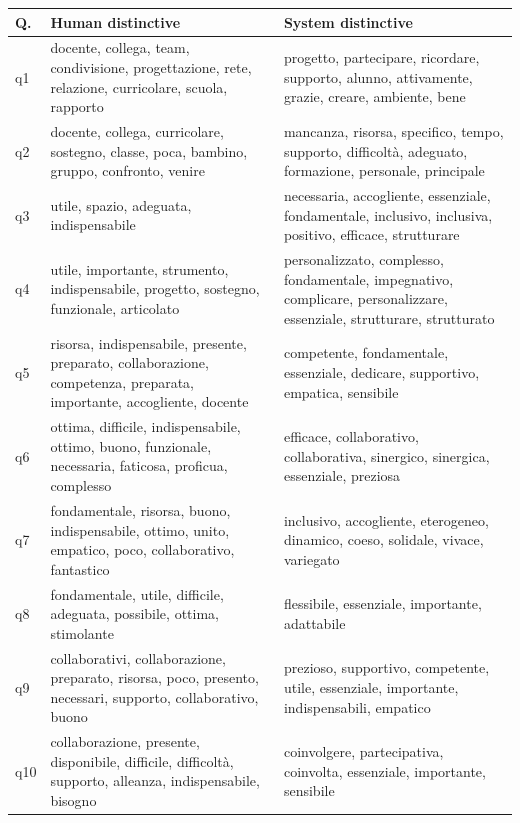 %
\begin{table}[t]
\centering
\small
\setlength{\tabcolsep}{6pt}
\renewcommand{\arraystretch}{1.2}
\begin{tabularx}{\linewidth}{l p{7cm} p{7cm}}
\toprule
\textbf{Q.} & \textbf{Human distinctive} & \textbf{System distinctive} \\
\midrule

q1 & docente, collega, team, condivisione, progettazione, rete, relazione, curricolare, scuola, rapporto & progetto, partecipare, ricordare, supporto, alunno, attivamente, grazie, creare, ambiente, bene \\
q2 & docente, collega, curricolare, sostegno, classe, poca, bambino, gruppo, confronto, venire & mancanza, risorsa, specifico, tempo, supporto, difficoltà, adeguato, formazione, personale, principale \\
\midrule
q3 & utile, spazio, adeguata, indispensabile & necessaria, accogliente, essenziale, fondamentale, inclusivo, inclusiva, positivo, efficace, strutturare \\
q4 & utile, importante, strumento, indispensabile, progetto, sostegno, funzionale, articolato & personalizzato, complesso, fondamentale, impegnativo, complicare, personalizzare, essenziale, strutturare, strutturato \\
q5 & risorsa, indispensabile, presente, preparato, collaborazione, competenza, preparata, importante, accogliente, docente & competente, fondamentale, essenziale, dedicare, supportivo, empatica, sensibile \\
q6 & ottima, difficile, indispensabile, ottimo, buono, funzionale, necessaria, faticosa, proficua, complesso & efficace, collaborativo, collaborativa, sinergico, sinergica, essenziale, preziosa \\
q7 & fondamentale, risorsa, buono, indispensabile, ottimo, unito, empatico, poco, collaborativo, fantastico & inclusivo, accogliente, eterogeneo, dinamico, coeso, solidale, vivace, variegato \\
q8 & fondamentale, utile, difficile, adeguata, possibile, ottima, stimolante & flessibile, essenziale, importante, adattabile \\
q9 & collaborativi, collaborazione, preparato, risorsa, poco, presento, necessari, supporto, collaborativo, buono & prezioso, supportivo, competente, utile, essenziale, importante, indispensabili, empatico \\
q10 & collaborazione, presente, disponibile, difficile, difficoltà, supporto, alleanza, indispensabile, bisogno & coinvolgere, partecipativa, coinvolta, essenziale, importante, sensibile \\

\end{tabularx}
\end{table}

